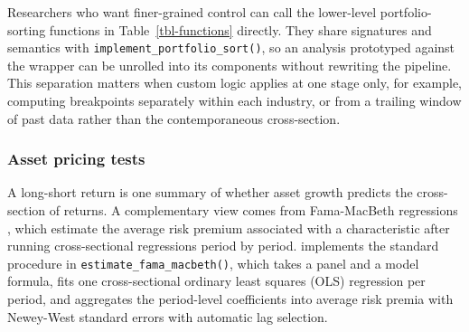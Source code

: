 \documentclass[
  article]{jss}
\begin{document}
\begin{table}


\caption{\label{tbl-customized-comparison}Comparison of long-short asset
growth returns across three specifications. The baseline is a univariate
sort with NYSE breakpoints and no filters. The bivariate-only
specification adds a dependent bivariate sort on size to the baseline
but otherwise keeps the same universe and breakpoints. The customized
specification adds the filter set (financials, utilities, non-positive
earnings) and a 20\% size threshold on the breakpoints. All rows use
annual July rebalancing; means are annualized value-weighted excess
returns. Sample: 1974--2024.}

\end{table}%

\endgroup

Researchers who want finer-grained control can call the lower-level
portfolio-sorting functions in Table~\ref{tbl-functions} directly. They
share signatures and semantics with
\texttt{implement\_portfolio\_sort()}, so an analysis prototyped against
the wrapper can be unrolled into its components without rewriting the
pipeline. This separation matters when custom logic applies at one stage
only, for example, computing breakpoints separately within each
industry, or from a trailing window of past data rather than the
contemporaneous cross-section.

\subsubsection{Asset pricing tests}\label{sec-fama-macbeth}

A long-short return is one summary of whether asset growth predicts the
cross-section of returns. A complementary view comes from Fama-MacBeth
regressions \citep{fama.1973}, which estimate the average risk premium
associated with a characteristic after running cross-sectional
regressions period by period.  implements the standard
procedure in \texttt{estimate\_fama\_macbeth()}, which takes a panel and
a model formula, fits one cross-sectional ordinary least squares (OLS)
regression per period, and aggregates the period-level coefficients into
average risk premia with Newey-West standard errors with automatic lag
selection.
\end{document}
